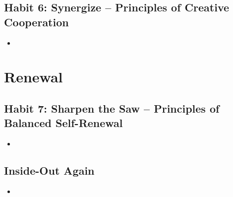 \documentclass[11pt]{article}
\begin{document}
\subsection{Habit 6: Synergize -- Principles of Creative Cooperation}
\begin{itemize}
\item 
\end{itemize}
\section{Renewal}
\subsection{Habit 7: Sharpen the Saw -- Principles of Balanced Self-Renewal}
\begin{itemize}
\item 
\end{itemize}
\subsection{Inside-Out Again}
\begin{itemize}
\item 
\end{itemize}
\newpage


\end{document}
